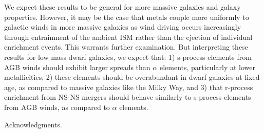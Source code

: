 \documentclass[twocolumn]{aastex61}
\begin{document}
We expect these results to be general for more massive galaxies and galaxy properties. However, it may be the case that metals couple more uniformly to galactic winds in more massive galaxies as wind driving occurs increasingly through entrainment of the ambient ISM rather than the ejection of individual enrichment events. This warrants further examination. But interpreting these results for low mass dwarf galaxies, we expect that: 1) s-process elements from AGB winds should exhibit larger spreads than $\alpha$ elements, particularly at lower metallicities, 2) these elements should be overabundant in dwarf galaxies at fixed age, as compared to massive galaxies like the Milky Way, and 3) that r-process enrichment from NS-NS mergers should behave similarly to s-process elements from AGB winds, as compared to $\alpha$ elements.




\acknowledgments
Acknowledgments.









\appendix
\renewcommand\thefigure{\thesection.\arabic{figure}}    
\setcounter{figure}{0}
\end{document}
